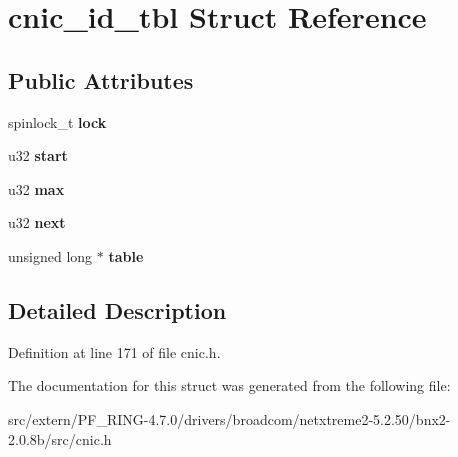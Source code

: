 \hypertarget{structcnic__id__tbl}{
\section{cnic\_\-id\_\-tbl Struct Reference}
\label{structcnic__id__tbl}
}
\subsection*{Public Attributes}
\begin{DoxyCompactItemize}
\item 
\hypertarget{structcnic__id__tbl_ad9c31572a4239ee915247dd5e3f2eaf0}{
spinlock\_\-t {\bfseries lock}}
\label{structcnic__id__tbl_ad9c31572a4239ee915247dd5e3f2eaf0}

\item 
\hypertarget{structcnic__id__tbl_ac3c228619b9828159fae29e09166b9bc}{
u32 {\bfseries start}}
\label{structcnic__id__tbl_ac3c228619b9828159fae29e09166b9bc}

\item 
\hypertarget{structcnic__id__tbl_ae9e7b3c6865781f86d3c16e4a7c848b0}{
u32 {\bfseries max}}
\label{structcnic__id__tbl_ae9e7b3c6865781f86d3c16e4a7c848b0}

\item 
\hypertarget{structcnic__id__tbl_a0266b9972962f91ee9689bbbf5154b18}{
u32 {\bfseries next}}
\label{structcnic__id__tbl_a0266b9972962f91ee9689bbbf5154b18}

\item 
\hypertarget{structcnic__id__tbl_a7826bf845d93e2a55d085c71cc49a45b}{
unsigned long $\ast$ {\bfseries table}}
\label{structcnic__id__tbl_a7826bf845d93e2a55d085c71cc49a45b}

\end{DoxyCompactItemize}


\subsection{Detailed Description}


Definition at line 171 of file cnic.h.



The documentation for this struct was generated from the following file:\begin{DoxyCompactItemize}
\item 
src/extern/PF\_\-RING-\/4.7.0/drivers/broadcom/netxtreme2-\/5.2.50/bnx2-\/2.0.8b/src/cnic.h\end{DoxyCompactItemize}
